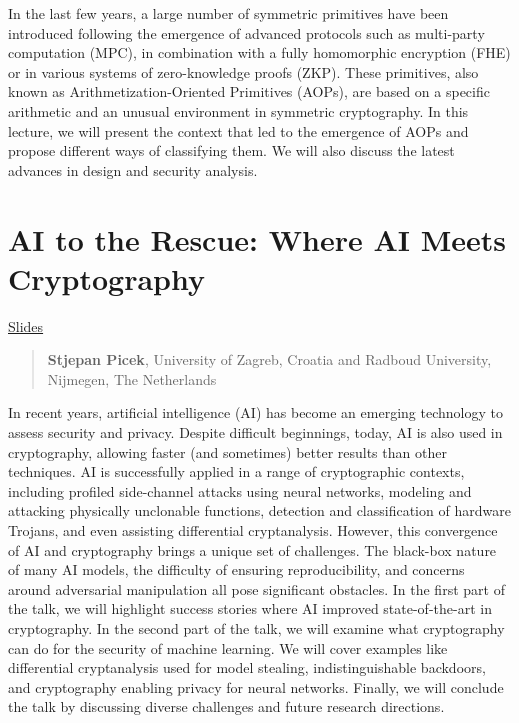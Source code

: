 \documentclass[11pt]{article}
\theoremstyle{definition}
\theoremstyle{remark}
\theoremstyle{plain}
\begin{document}
In the last few years, a large number of symmetric primitives have been introduced following the emergence of advanced protocols such as multi-party computation (MPC), in combination with a fully homomorphic encryption (FHE) or in various systems of zero-knowledge proofs (ZKP). These primitives, also known as Arithmetization-Oriented Primitives (AOPs), are based on a specific arithmetic and an unusual environment in symmetric cryptography. In this lecture, we will present the context that led to the emergence of AOPs and propose different ways of classifying them. We will also discuss the latest advances in design and security analysis.

\section{AI to the Rescue: Where AI Meets Cryptography}
\begin{center}
\href{https://sacworkshop.org/SAC25/slides/Picek1.pdf}{Slides}
\end{center}

\begin{quote}
\textbf{Stjepan Picek}, University of Zagreb, Croatia and Radboud University, Nijmegen, The Netherlands
\end{quote}

In recent years, artificial intelligence (AI) has become an emerging technology to assess security and privacy. Despite difficult beginnings, today, AI is also used in cryptography, allowing faster (and sometimes) better results than other techniques. AI is successfully applied in a range of cryptographic contexts, including profiled side-channel attacks using neural networks, modeling and attacking physically unclonable functions, detection and classification of hardware Trojans, and even assisting differential cryptanalysis. However, this convergence of AI and cryptography brings a unique set of challenges. The black-box nature of many AI models, the difficulty of ensuring reproducibility, and concerns around adversarial manipulation all pose significant obstacles. In the first part of the talk, we will highlight success stories where AI improved state-of-the-art in cryptography. In the second part of the talk, we will examine what cryptography can do for the security of machine learning. We will cover examples like differential cryptanalysis used for model stealing, indistinguishable backdoors, and cryptography enabling privacy for neural networks. Finally, we will conclude the talk by discussing diverse challenges and future research directions.
\end{document}
